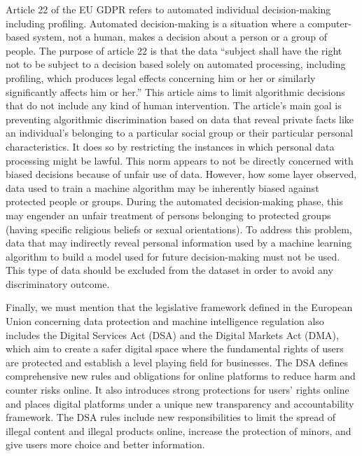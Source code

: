 Article 22 of the EU GDPR refers to automated individual decision-making including profiling. Automated decision-making is a situation where a computer-based system, not a human, makes a decision about a person or a group of people. The purpose of article 22 is that the data ``subject shall have the right not to be subject to a decision based solely on automated processing, including profiling, which produces legal effects concerning him or her or similarly significantly affects him or her.'' This article aims to limit algorithmic decisions that do not include any kind of human intervention. The article's main goal is preventing algorithmic discrimination based on data that reveal private facts like an individual's belonging to a particular social group or their particular personal characteristics. It does so by restricting the instances in which personal data processing might be lawful. This norm appears to not be directly concerned with biased decisions because of unfair use of data. However, how some layer observed, data used to train a machine algorithm may be inherently biased against protected people or groups. During the automated decision-making phase, this may engender an unfair treatment of persons belonging to protected groups (having specific religious beliefs or sexual orientations). To address this problem, data that may indirectly reveal personal information used by a machine learning algorithm to build a model used for future decision-making must not be used. This type of data should be excluded from the dataset in order to avoid any discriminatory outcome.

Finally, we must mention that the legislative framework defined in the \hbox{European} Union concerning data protection and machine intelligence regulation also includes the Digital Services Act (DSA) and the Digital Markets Act (DMA), which aim to create a safer digital space where the fundamental rights of users are protected and establish a level playing field for businesses. The DSA defines comprehensive new rules and obligations for online platforms to reduce harm and counter risks online. It also introduces strong protections for users' rights online and places digital platforms under a unique new transparency and accountability framework. The DSA rules include new responsibilities to limit the spread of illegal content and illegal products online, increase the protection of minors, and give users more choice and better information.

